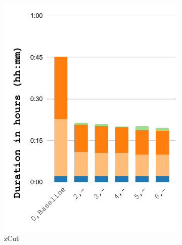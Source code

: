 \documentclass[Ingles]{ic-tese-v3}
\begin{document}
\begin{figure}[]
\begin{subfigure}{0.3\textwidth}
        \includegraphics[width=\textwidth,trim={0 0 0 0},clip]{figures/prefetch_breakdown/prefetch_breakdown_zcut_salt.pdf}
        \caption{zCut}
        \label{fig:prefetch_breakdown_zcut}
    \end{subfigure}%
    \begin{subfigure}{0.3\textwidth}

\end{subfigure}
\end{figure}
\end{document}
